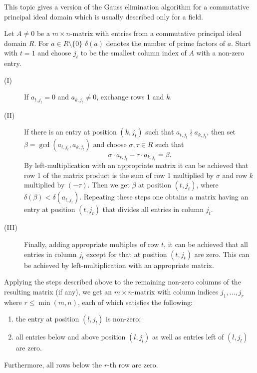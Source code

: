 \documentclass[12pt]{article}
\begin{document}
This topic gives a version of the Gauss elimination algorithm for a commutative principal ideal domain which is usually described only for a field.

Let $A \ne 0$ be a $m \times n$-matrix with entries from a commutative principal ideal
domain $R$. For $a \in R \setminus \{0\}$ $\delta(a)$ denotes the number of
prime factors of $a$. Start with $t=1$ and choose $j_t$ to be the smallest
column index of $A$ with a non-zero entry.
\begin{description}
\item[(I)]
If $a_{t, j_t}=0$ and $a_{k,j_t} \ne 0$, exchange rows 1 and $k$.
\item[(II)]
If there is an entry at position $(k,j_t)$ such that $a_{t,j_t} \nmid
a_{k,j_t}$, then set $\beta =\gcd\left(a_{t,j_t}, a_{k,j_t}\right)$ and choose
$\sigma, \tau \in R$ such that
\begin{equation*}
\sigma\cdot a_{t,j_t}-\tau \cdot a_{k,j_t}=\beta.
\end{equation*}
By left-multiplication with an appropriate matrix it can be achieved that row 1
of the matrix product is the sum of row 1 multiplied by $\sigma$ and row $k$
multiplied by $(-\tau)$. Then we get $\beta$ at position $(t,j_t)$, where
$\delta(\beta) < \delta(a_{t,j_t})$.
Repeating these steps one obtains a matrix having an entry at position
$(t,j_t)$ that divides all entries in column $j_t$.
\item[(III)]
Finally, adding appropriate multiples of row $t$, it can be achieved that all
entries in column $j_t$ except for that at position $(t,j_t)$ are zero. This can
be achieved by left-multiplication with an appropriate matrix.
\end{description}
Applying the steps described above to the remaining non-zero columns of the
resulting matrix (if any), we get an $m \times n$-matrix with column indices
$j_1, \ldots, j_r$ where $r \le \min(m,n)$, each of which satisfies the
following:
\begin{enumerate}
\item
the entry at position $(l,j_l)$ is non-zero;
\item
all entries below and above position $(l,j_l)$ as well as entries left of
$(l,j_l)$ are zero.
\end{enumerate}
Furthermore, all rows below the $r$-th row are zero.
\end{document}
